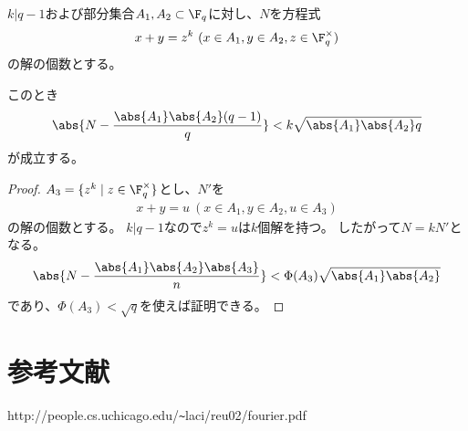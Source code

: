 \documentclass{jsarticle}
\begin{document}
\begin{thm}
$k\vert q-1$および部分集合$A_1,A_2\subset \F_q$に対し、$N$を方程式
\begin{align*}
x+y=z^k~(x\in A_1,y\in A_2, z\in\F_q^\times)
\end{align*}
の解の個数とする。

このとき
\begin{align*}
\abs{N-\frac{\abs{A_1}\abs{A_2}(q-1)}{q}}<k\sqrt{\abs{A_1}\abs{A_2}q}
\end{align*}
が成立する。
\end{thm}
\begin{proof}
$A_3=\{z^k\mid z\in\F_q^\times\}$とし、$N'$を
\begin{align*}
x+y=u~(x\in A_1, y\in A_2, u\in A_3)
\end{align*}
の解の個数とする。
$k\vert q-1$なので$z^k=u$は$k$個解を持つ。
したがって$N=kN'$となる。
\begin{align*}
\abs{N-\frac{\abs{A_1}\abs{A_2}\abs{A_3}}{n}}<\Phi(A_3)\sqrt{\abs{A_1}\abs{A_2}}
\end{align*}
であり、$\Phi(A_3)<\sqrt{q}$を使えば証明できる。
\end{proof}

\section*{参考文献}
http://people.cs.uchicago.edu/\verb|~|laci/reu02/fourier.pdf
\end{document}
